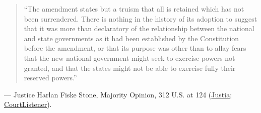 \documentclass[12pt]{article}
\begin{document}
\begin{quote}
``The amendment states but a truism that all is retained which has not been surrendered. There is nothing in the history of its adoption to suggest that it was more than declaratory of the relationship between the national and state governments as it had been established by the Constitution before the amendment, or that its purpose was other than to allay fears that the new national government might seek to exercise powers not granted, and that the states might not be able to exercise fully their reserved powers.''
\end{quote}
\noindent --- Justice Harlan Fiske Stone, Majority Opinion, 312 U.S. at 124 (\href{https://supreme.justia.com/cases/federal/us/312/100/}{Justia}; \href{https://www.courtlistener.com/opinion/103442/united-states-v-darby/}{CourtListener}).
\end{document}
